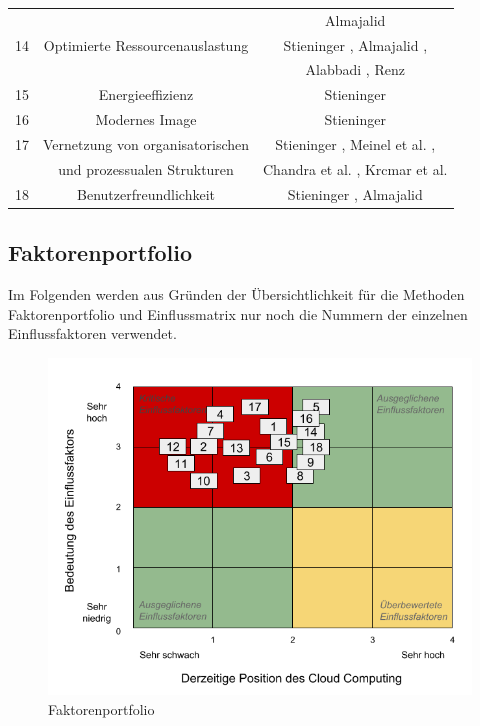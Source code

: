 \begin{table}[!htb]
\begin{center}
{\begin{tabular}{c c c }
				&& Almajalid \cite{almajalid} \\
				14 & Optimierte Ressourcenauslastung & Stieninger \cite{stieninger}, Almajalid \cite{almajalid}, \\
				&& Alabbadi \cite{alabbadi}, Renz \cite{renz} \\
				15 & Energieeffizienz & Stieninger \cite{stieninger} \\
				16 & Modernes Image & Stieninger \cite{stieninger} \\
				17 & Vernetzung von organisatorischen & Stieninger \cite{stieninger}, Meinel et al. \cite{meinel}, \\
				& und prozessualen Strukturen & Chandra et al. \cite{chandra}, Krcmar et al. \cite{krcmar} \\
				18 & Benutzerfreundlichkeit & Stieninger \cite{stieninger}, Almajalid \cite{almajalid} \\
				\hline
			\end{tabular}
		}
		\label{tab:factors1}
	\end{center}
\end{table}
\FloatBarrier

\subsection{Faktorenportfolio}

Im Folgenden werden aus Gründen der Übersichtlichkeit für die Methoden Faktorenportfolio und Einflussmatrix nur noch die Nummern der einzelnen Einflussfaktoren verwendet.


\begin{figure}
	\centering
	\includegraphics[width=\linewidth]{images/portfolio}
	\caption[Caption for parameters]{Faktorenportfolio}
	\label{fig:portfolio}
\end{figure}

